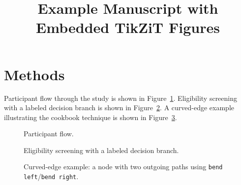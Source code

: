 \documentclass{article}
\begin{document}
\title{Example Manuscript with Embedded TikZiT Figures}
\author{}
\date{}
\maketitle

\section{Methods}

Participant flow through the study is shown in Figure~\ref{fig:flow}.
Eligibility screening with a labeled decision branch is shown in
Figure~\ref{fig:decision}. A curved-edge example illustrating the cookbook
technique is shown in Figure~\ref{fig:curved}.

\begin{figure}[htbp]
    \centering
    
    \caption{Participant flow.}
    \label{fig:flow}
\end{figure}

\begin{figure}[htbp]
    \centering
    
    \caption{Eligibility screening with a labeled decision branch.}
    \label{fig:decision}
\end{figure}

\begin{figure}[htbp]
    \centering
    
    \caption{Curved-edge example: a node with two outgoing paths using
             \texttt{bend left}/\texttt{bend right}.}
    \label{fig:curved}
\end{figure}
\end{document}
